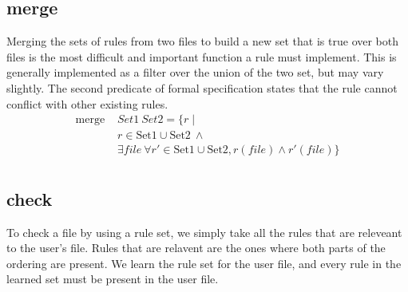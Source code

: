 \subsection{merge}
  Merging the sets of rules from two files to build a new set that is true over both files is the most difficult and important function a rule must implement.
  This is generally implemented as a filter over the union of the two set, but may vary slightly.
  The second predicate of formal specification states that the rule cannot conflict with other existing rules.
  \begin{align*}
  \text{merge }& Set1 \: Set2= \{r \mid \\
    & r \in \text{Set1} \cup \text{Set2}\ \land \\
    & \exists file\ \forall r' \in \text{Set1} \cup \text{Set2}, r(file) \land r'(file) \} \\
  \end{align*}

\subsection{check}
  To check a file by using a rule set, we simply take all the rules that are releveant to the user's file.
  Rules that are relavent are the ones where both parts of the ordering are present.
  We learn the rule set for the user file, and every rule in the learned set must be present in the user file.

